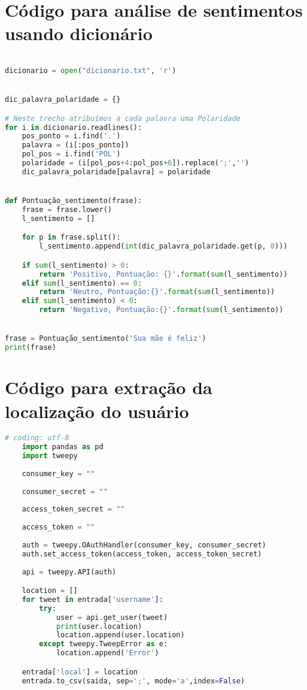 \section{Código para análise de sentimentos usando dicionário}
\label{cod:analise}

\begin{lstlisting}[language=Python]

dicionario = open("dicionario.txt", 'r')


dic_palavra_polaridade = {} 

# Neste trecho atribuímos a cada palavra uma Polaridade
for i in dicionario.readlines(): 
    pos_ponto = i.find('.')
    palavra = (i[:pos_ponto])
    pol_pos = i.find('POL')
    polaridade = (i[pol_pos+4:pol_pos+6]).replace(';','')
    dic_palavra_polaridade[palavra] = polaridade


def Pontuação_sentimento(frase):
    frase = frase.lower()
    l_sentimento = []

    for p in frase.split():
        l_sentimento.append(int(dic_palavra_polaridade.get(p, 0)))

    if sum(l_sentimento) > 0:
        return 'Positivo, Pontuação: {}'.format(sum(l_sentimento))
    elif sum(l_sentimento) == 0:
        return 'Neutro, Pontuação:{}'.format(sum(l_sentimento))
    elif sum(l_sentimento) < 0:
        return 'Negativo, Pontuação:{}'.format(sum(l_sentimento))


frase = Pontuação_sentimento('Sua mãe é feliz')
print(frase)
\end{lstlisting}


\section{Código para extração da localização do usuário}
\label{cod:geo}
\begin{lstlisting}[language=Python]
    # coding: utf-8
    import pandas as pd  
    import tweepy
    
    consumer_key = ""
    
    consumer_secret = ""
    
    access_token_secret = ""
    
    access_token = ""
    
    auth = tweepy.OAuthHandler(consumer_key, consumer_secret)
    auth.set_access_token(access_token, access_token_secret)
    
    api = tweepy.API(auth)

    location = []
    for tweet in entrada['username']:
        try:
            user = api.get_user(tweet)
            print(user.location)
            location.append(user.location)
        except tweepy.TweepError as e:
            location.append('Error')

    entrada['local'] = location
    entrada.to_csv(saida, sep=';', mode='a',index=False)
    
    
\end{lstlisting}

